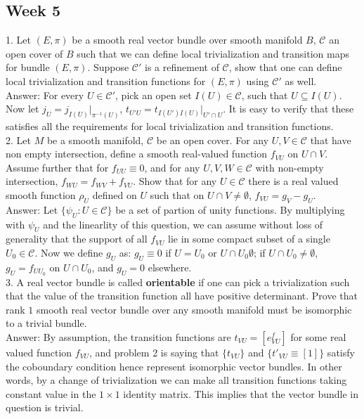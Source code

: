 \documentclass{article}
\theoremstyle{definition}
\begin{document}
\newpage

\subsection{Week 5}

1. Let $(E, \pi)$ be a smooth real vector bundle over smooth manifold $B$, $\mathcal{C}$ an open cover of $B$ such that we can define local trivialization and transition maps for bundle $(E, \pi)$. Suppose $\mathcal{C}'$ is a refinement of $\mathcal{C}$, show that one can define local trivialization and transition functions for $(E, \pi)$ using $\mathcal{C}'$ as well.\\

Answer: For every $U\in \mathcal{C'}$, pick an open set $I(U)\in\mathcal{C}$, such that $U\subseteq I(U)$. Now let $j_U=j_{I(U)}|_{\pi^{-1}(U)}$, $t_{U'U}=t_{I(U')I(U)}|_{U'\cap U}$. It is easy to verify that these satisfies all the requirements for local trivialization and transition functions.\\ 

2. Let $M$ be a smooth manifold, $\mathcal{C}$ be an open cover. For any $U, V\in \mathcal{C}$ that have non empty intersection, define a smooth real-valued function $f_{VU}$ on $U\cap V$. Assume further that for $f_{UU}\equiv 0$, and for any $U, V, W\in \mathcal{C}$ with non-empty intersection, $f_{WU}=f_{WV}+f_{VU}$. Show that for any $U\in \mathcal{C}$ there is a real valued smooth function $\rho_U$ defined on $U$ such that on $U\cap V\not=\emptyset$, $f_{VU}=g_V-g_U$.\\

Answer: Let $\{\psi_U: U\in\mathcal{C}\}$ be a set of partion of unity functions. By multiplying with $\psi_U$ and the linearlity of this question, we can assume without loss of generality that the support of all $f_{VU}$ lie in some compact subset of a single $U_0\in\mathcal{C}$. Now we define $g_U$ as: $g_U\equiv 0$ if $U=U_0$ or $U\cap U_0\emptyset$; if $U\cap U_0\not=\emptyset$, $g_U=f_{UU_0}$ on $U\cap U_0$, and $g_U=0$ elsewhere.\\

3. A real vector bundle is called {\bf orientable} if one can pick a trivialization such that the value of the transition function all have positive determinant. Prove that rank $1$ smooth real vector bundle over any smooth manifold must be isomorphic to a trivial bundle.\\

Answer: By assumption, the transition functions are $t_{VU}=[e^f_{VU}]$ for some real valued function $f_{VU}$, and problem 2 is saying that $\{t_{VU}\}$ and $\{t'_{VU}\equiv [1]\}$ satisfy the coboundary condition hence represent isomorphic vector bundles. In other words, by a change of trivialization we can make all transition functions taking constant value in the $1\times 1$ identity matrix. This implies that the vector bundle in question is trivial.
\end{document}
